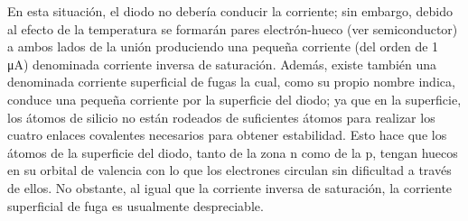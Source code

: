 \documentclass{article}
\begin{document}
En esta situación, el diodo no debería conducir la corriente; sin embargo, debido al efecto de la temperatura se formarán pares electrón-hueco (ver semiconductor) a ambos lados de la unión produciendo una pequeña corriente (del orden de 1 μA) denominada corriente inversa de saturación. Además, existe también una denominada corriente superficial de fugas la cual, como su propio nombre indica, conduce una pequeña corriente por la superficie del diodo; ya que en la superficie, los átomos de silicio no están rodeados de suficientes átomos para realizar los cuatro enlaces covalentes necesarios para obtener estabilidad. Esto hace que los átomos de la superficie del diodo, tanto de la zona n como de la p, tengan huecos en su orbital de valencia con lo que los electrones circulan sin dificultad a través de ellos. No obstante, al igual que la corriente inversa de saturación, la corriente superficial de fuga es usualmente despreciable.\citep{diodoWiki}\\





\end{document}
